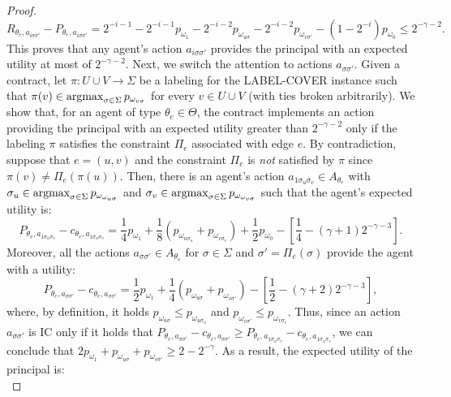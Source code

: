 \begin{proof}
	\[
		R_{\theta_{e}, a_{i \sigma \sigma'} } - P_{\theta_e, a_{i \sigma \sigma'} } = 2^{-i-1} - 2^{-i-1} p_{\omega_1} - 2^{-i-2} p_{\omega_{u\sigma}} -2^{-i-2} p_{\omega_{v \sigma'}}- \left( 1-2^{-i} \right) p_{ \omega_0}    \leq 2^{-\gamma-2}.
	\]
	This proves that any agent's action $a_{i \sigma \sigma'}$ provides the principal with an expected utility at most of $2^{-\gamma-2}$.
	Next, we switch the attention to actions $a_{\sigma \sigma'}$.
	Given a contract, let $\pi : U \cup V \to \Sigma$ be a labeling for the \textsf{LABEL-COVER} instance such that $\pi(v) \in \operatorname*{argmax}_{\sigma \in \Sigma} p_{\omega_{v \sigma}}$ for every $v \in U \cup V$ (with ties broken arbitrarily).
	We show that, for an agent of type $\theta_e \in \Theta$, the contract implements an action providing the principal with an expected utility greater than $2^{-\gamma-2}$ only if the labeling $\pi$ satisfies the constraint $\Pi_e$ associated with edge $e$.
	By contradiction, suppose that $e = (u,v)$ and the constraint $\Pi_e$ is \emph{not} satisfied by $\pi$ since $\pi(v) \neq \Pi_e(\pi(u))$.
	Then, there is an agent's action $a_{1 \sigma_u \sigma_v} \in A_{\theta_e}$ with $\sigma_u \in \operatorname*{argmax}_{\sigma \in \Sigma} p_{\omega_{\omega_{u \sigma} }  }$ and $\sigma_v \in \operatorname*{argmax}_{\sigma \in \Sigma} p_{\omega_{\omega_{v \sigma} }  }$ such that the agent's expected utility is:
	\[
		P_{\theta_e, a_{1 \sigma_u \sigma_v}} - c_{\theta_e, a_{1 \sigma_u \sigma_v}} = \frac{1}{4} p_{\omega_1} + \frac{1}{8} \left(  p_{\omega_{u \sigma_u} }  +  p_{\omega_{v \sigma_v} }  \right) + \frac{1}{2} p_{\omega_0} - \left[ \frac{1}{4} - (\gamma+1) 2^{-\gamma - 3} \right].
	\]
	Moreover, all the actions $a_{\sigma \sigma'} \in A_{\theta_e}$ for $\sigma \in \Sigma$ and $\sigma' = \Pi_e(\sigma)$ provide the agent with a utility:
	\[
		P_{\theta_e, a_{ \sigma \sigma'}} - c_{\theta_e, a_{ \sigma \sigma'}} =\frac{1}{2}p_{\omega_1}+\frac{1}{4} \left( p_{\omega_{u \sigma}}+p_{\omega_{v \sigma'}} \right)- \left[ \frac{1}{2}-(\gamma+2) 2^{-\gamma-3}\right],
	\]
	where, by definition, it holds $p_{\omega_{u \sigma}}\le p_{\omega_{u\sigma_u}}$ and $p_{\omega_{v \sigma'}}\le p_{\omega_{v \sigma_v}}$.
	Thus, since an action $a_{\sigma \sigma'}$ is IC only if it holds that $P_{\theta_e, a_{ \sigma \sigma'}} - c_{\theta_e, a_{ \sigma \sigma'}} \geq P_{\theta_e, a_{1 \sigma_u \sigma_v}} - c_{\theta_e, a_{1 \sigma_u \sigma_v}} $, we can conclude that $2p_{\omega_1} +p_{\omega_{u \sigma}}+p_{\omega_{v \sigma'}} \ge 2- 2^{-\gamma}$.
	As a result, the expected utility of the principal is:
	\[
\]
\end{proof}
